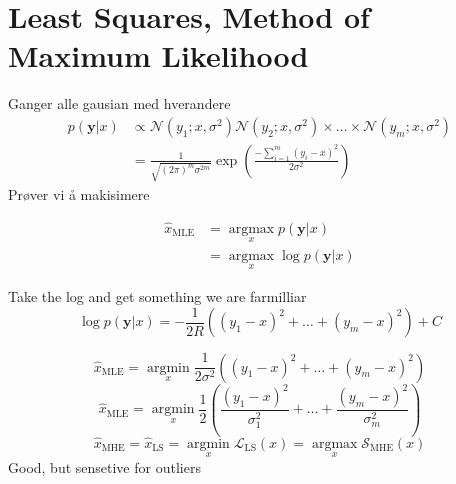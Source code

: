 \documentclass{article}
\begin{document}
\newpage

\section*{Least Squares, Method of Maximum Likelihood}
Ganger alle gausian med hverandere
\begin{equation}
\begin{aligned} p(\mathbf{y} | x) & \propto \mathcal{N}\left(y_{1} ; x, \sigma^{2}\right) \mathcal{N}\left(y_{2} ; x, \sigma^{2}\right) \times \ldots \times \mathcal{N}\left(y_{m} ; x, \sigma^{2}\right) \\ &=\frac{1}{\sqrt{(2 \pi)^{m} \sigma^{2 m}}} \exp \left(\frac{-\sum_{i=1}^{m}\left(y_{i}-x\right)^{2}}{2 \sigma^{2}}\right)
\end{aligned}
\end{equation}
Prøver vi å makisimere

\begin{equation}
\begin{aligned} \hat{x}_{\mathrm{MLE}} &=\underset{x}{\operatorname{argmax}} p(\mathbf{y} | x) \\ &=\underset{x}{\operatorname{argmax}} \log p(\mathbf{y} | x) \end{aligned}\end{equation}

Take the log and get something we are farmilliar
\begin{equation}
\log p(\mathbf{y} | x)=-\frac{1}{2 R}\left(\left(y_{1}-x\right)^{2}+\ldots+\left(y_{m}-x\right)^{2}\right)+C
\end{equation}

\begin{equation}
\hat{x}_{\mathrm{MLE}}=\underset{x}{\operatorname{argmin}} \frac{1}{2 \sigma^{2}}\left(\left(y_{1}-x\right)^{2}+\ldots+\left(y_{m}-x\right)^{2}\right)
\end{equation}
\begin{equation}
\hat{x}_{\mathrm{MLE}}=\underset{x}{\operatorname{argmin}} \frac{1}{2}\left(\frac{\left(y_{1}-x\right)^{2}}{\sigma_{1}^{2}}+\ldots+\frac{\left(y_{m}-x\right)^{2}}{\sigma_{m}^{2}}\right) 
\end{equation}
\begin{equation}
 \hat{x}_{\mathrm{MHE}}=\hat{x}_{\mathrm{LS}}=\underset{x}{\operatorname{argmin}} 
 \mathscr{L}_{\mathrm{LS}}(x)=\underset{x}{\operatorname{argmax}} \mathscr{S}_{\mathrm{MHE}}(x)
\end{equation}
Good, but sensetive for outliers
\end{document}
